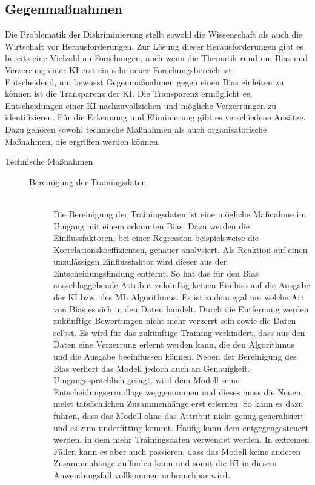 \begin{onehalfspace}
    \subsection{Gegenmaßnahmen}
    \label{subsubsec:gegenmassnahmen}
        Die Problematik der Diskriminierung stellt sowohl die Wissenschaft als auch die Wirtschaft vor Herausforderungen. Zur Lösung dieser Herausforderungen gibt es bereits eine Vielzahl an Forschungen, auch wenn die Thematik rund um Bias und Verzerrung einer \ac*{KI} erst ein sehr neuer Forschungsbereich ist.
        \\
        Entscheidend, um bewusst Gegenmaßnahmen gegen einen Bias einleiten zu können ist die Transparenz der \ac*{KI}. Die Transparenz ermöglicht es, Entscheidungen einer \ac*{KI} nachzuvollziehen und mögliche Verzerrungen zu identifizieren. Für die Erkennung und Eliminierung gibt es verschiedene Ansätze. Dazu gehören sowohl technische Maßnahmen als auch organisatorische Maßnahmen, die ergriffen werden können. 
        \begin{description}
            \item[Technische Maßnahmen] \hfill
            \begin{description}
                \item[Bereinigung der Trainingsdaten] \hfill \\
                Die Bereinigung der Trainingsdaten ist eine mögliche Maßnahme im Umgang mit einem erkannten Bias. Dazu werden die Einflussfaktoren, bei einer Regression beispielsweise die Korrelationskoeffizienten, genauer analysiert. Als Reaktion auf einen unzulässigen Einflussfaktor wird dieser aus der Entscheidungsfindung entfernt. So hat das für den Bias ausschlaggebende Attribut zukünftig keinen Einfluss auf die Ausgabe der \ac*{KI} bzw. des \ac*{ML} Algorithmus. Es ist zudem egal um welche Art von Bias es sich in den Daten handelt. Durch die Entfernung werden zukünftige Bewertungen nicht mehr verzerrt sein sowie die Daten selbst. Es wird für das zukünftige Training verhindert, dass aus den Daten eine Verzerrung erlernt werden kann, die den Algorithmus und die Ausgabe beeinflussen können.\cite{hagendorff2019maschinelles} Neben der Bereinigung des Bias verliert das Modell jedoch auch an Genauigkeit. Umgangssprachlich gesagt, wird dem Modell seine Entscheidungsgrundlage weggenommen und dieses muss die Neuen, meist tatsächlichen Zusammenhänge erst erlernen. So kann es dazu führen, dass das Modell ohne das Attribut nicht genug generalisiert und es zum underfitting kommt. Häufig kann dem entgegengesteuert werden, in dem mehr Trainingsdaten verwendet werden. In extremen Fällen kann es aber auch passieren, dass das Modell keine anderen Zusammenhänge auffinden kann und somit die \ac*{KI} in diesem Anwendungsfall vollkommen unbrauchbar wird.\cite{hagendorff2019maschinelles}\cite{Fabi2022}


\end{description}
\end{description}
\end{onehalfspace}
